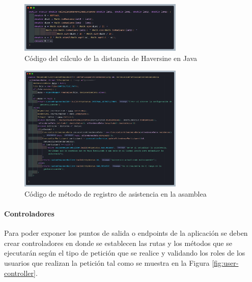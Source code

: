 \begin{figure}[H]
    \centering
    \includegraphics[width=0.7\textwidth]{resources/images/haversine}
    \caption{Código del cálculo de la distancia de Haversine en Java}
    \label{fig:haversine}
\end{figure}

\begin{figure}[H]
    \centering
    \includegraphics[width=0.7\textwidth]{resources/images/attendance-geolocation}
    \caption{Código de método de registro de asistencia en la asamblea}
    \label{fig:asamblea-asistencia-movil}
\end{figure}

\paragraph{Controladores}

Para poder exponer los puntos de salida o endpoints de la aplicación se deben crear controladores en donde se establecen las rutas y los métodos que se ejecutarán según el tipo de petición que se realice y validando los roles de los usuarios que realizan la petición tal como se muestra en la Figura \ref{fig:user-controller}.

